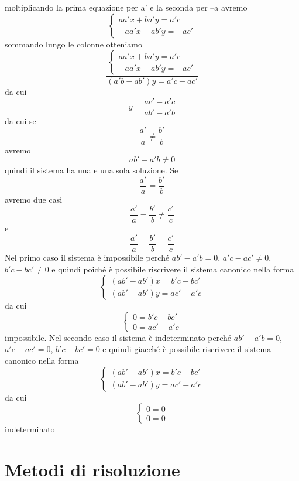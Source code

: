 moltiplicando la prima equazione per a' e la seconda per --a avremo  \[\left\{\begin{array}{l} {aa'x+ba'y=a'c} \\ {-aa'x-ab'y=-ac'} \end{array}\right. \] sommando lungo le colonne otteniamo  \[\dfrac{\left\{\begin{array}{l} {aa'x+ba'y=a'c} \\ {-aa'x-ab'y=-ac'} \end{array}\right. }{\left(a'b-ab'\right)y=a'c-ac'} \] da cui \[y=\dfrac{ac'-a'c}{ab'-a'b} \]  da cui se  \[\dfrac{a'}{a} \ne \dfrac{b'}{b} \] avremo  \[ab'-a'b\ne 0\]  quindi il sistema ha una e una sola soluzione.
Se \[\dfrac{a'}{a} =\dfrac{b'}{b} \]  avremo due casi  \[\dfrac{a'}{a} =\dfrac{b'}{b} \ne \dfrac{c'}{c} \]  e  \[\dfrac{a'}{a} =\dfrac{b'}{b} =\dfrac{c'}{c} \]
Nel primo caso il sistema è impossibile perché  $ab'-a'b=0$, $a'c-ac'\ne 0$, $b'c-bc'\ne 0$  e quindi poiché è possibile riscrivere il sistema canonico nella forma  \[\left\{\begin{array}{l} {\left(ab'-ab'\right)x=b'c-bc'} \\ {\left(ab'-ab'\right)y=ac'-a'c} \end{array}\right. \]  da cui  \[\left\{\begin{array}{l} {0=b'c-bc'} \\ {0=ac'-a'c} \end{array}\right. \] impossibile.
Nel secondo caso il sistema è indeterminato perché  $ab'-a'b=0$, $a'c-ac'=0$, $b'c-bc'=0$  e quindi giacché è possibile riscrivere il sistema canonico nella forma  \[\left\{\begin{array}{l} {\left(ab'-ab'\right)x=b'c-bc'} \\ {\left(ab'-ab'\right)y=ac'-a'c} \end{array}\right. \]  da cui \[\left\{\begin{array}{l} {0=0} \\ {0=0} \end{array}\right. \]  indeterminato
\section{Metodi di risoluzione}
\label{sec:MetodiDiRisoluzione}
